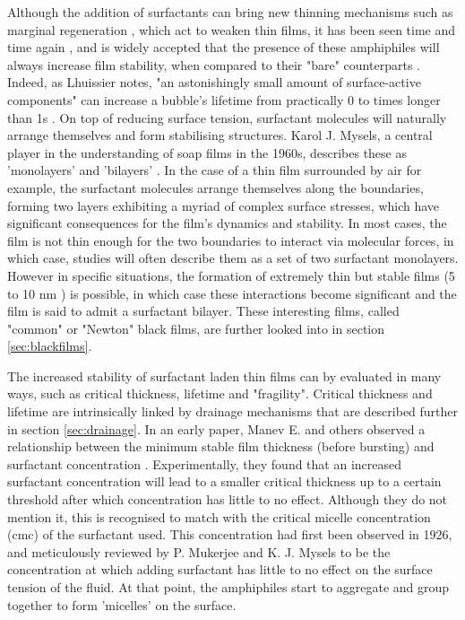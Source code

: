 \documentclass[a4paper,12pt]{article}
\numberwithin{equation}{section}
\numberwithin{figure}{section}
\numberwithin{table}{section}
\begin{document}
Although the addition of surfactants can bring new thinning mechanisms such as marginal regeneration \cite{Mysels1959Book, Nierstrasz1999}, which act to weaken thin films, it has been seen time and time again \cite{Bhamla2017, ChampougnyNotBare2016, Modini2013, Lhuissier2011, Pfeiffer2020}, and is widely accepted that the presence of these amphiphiles will always increase film stability, when compared to their "bare" counterparts \cite{Debregeas1998}. Indeed, as Lhuissier notes, "an astonishingly small amount of surface-active components" can increase a bubble's lifetime from practically 0 to times longer than 1s \cite{Lhuissier2011, Breward2002}. On top of reducing surface tension, surfactant molecules will naturally arrange themselves and form stabilising structures. Karol J. Mysels, a central player in the understanding of soap films in the 1960s, describes these as 'monolayers' and 'bilayers' \cite{Mysels1968Nomenclature}. In the case of a thin film surrounded by air for example, the surfactant molecules arrange themselves along the boundaries, forming two layers exhibiting a myriad of complex surface stresses, which have significant consequences for the film's dynamics and stability. In most cases, the film is not thin enough for the two boundaries to interact via molecular forces, in which case, studies will often describe them as a set of two surfactant monolayers. However in specific situations, the formation of extremely thin but stable films (5 to 10 nm \cite{Seung2006}) is possible, in which case these interactions become significant and the film is said to admit a surfactant bilayer. These interesting films, called "common" or "Newton" black films, are further looked into in section \ref{sec:blackfilms}.

The increased stability of surfactant laden thin films can by evaluated in many ways, such as critical thickness, lifetime and "fragility". Critical thickness and lifetime are intrinsically linked by drainage mechanisms that are described further in section \ref{sec:drainage}. In an early paper, Manev E. and others observed a relationship between the minimum stable film thickness (before bursting) and surfactant concentration \cite{Manev1974}. Experimentally, they found that an increased surfactant concentration will lead to a smaller critical thickness up to a certain threshold after which concentration has little to no effect. Although they do not mention it, this is recognised to match with the critical micelle concentration (cmc) of the surfactant used. This concentration had first been observed in 1926, and meticulously reviewed by P. Mukerjee and K. J. Mysels \cite{Mukerjee1971} to be the concentration at which adding surfactant has little to no effect on the surface tension of the fluid. At that point, the amphiphiles start to aggregate and group together to form 'micelles' on the surface. %
\end{document}
